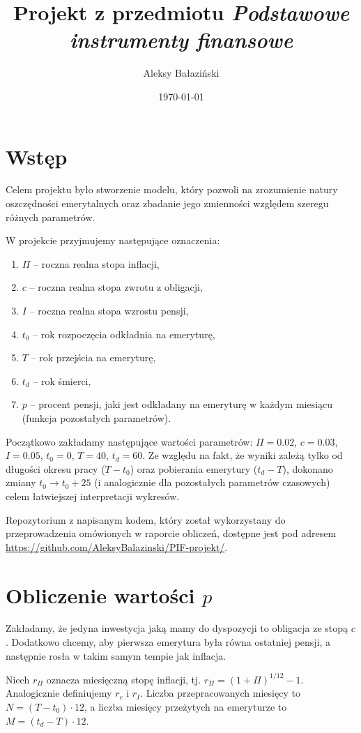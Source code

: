 \documentclass{article}
\title{Projekt z przedmiotu \textit{Podstawowe instrumenty finansowe}}
\author{Aleksy Bałaziński}
\date{\today}
\begin{document}
\maketitle

\section{Wstęp}
Celem projektu było stworzenie modelu, który pozwoli na zrozumienie natury oszczędności emerytalnych oraz zbadanie jego zmienności względem szeregu różnych parametrów.

W projekcie przyjmujemy następujące oznaczenia:
\begin{enumerate}
    \item $\Pi$ -- roczna realna stopa inflacji,
    \item $c$ -- roczna realna stopa zwrotu z obligacji,
    \item $I$ -- roczna realna stopa wzrostu pensji,
    \item $t_0$ -- rok rozpoczęcia odkładnia na emeryturę,
    \item $T$ -- rok przejścia na emeryturę,
    \item $t_d$ -- rok śmierci,
    \item $p$ -- procent pensji, jaki jest odkładany na emeryturę w każdym miesiącu (funkcja pozostałych parametrów).
\end{enumerate}
Początkowo zakładamy następujące wartości parametrów: $\Pi = 0.02$, $c = 0.03$, $I=0.05$, $t_0 = 0$, $T=40$, $t_d = 60$.
Ze względu na fakt, że wyniki zależą tylko od długości okresu pracy ($T - t_0$) oraz pobierania emerytury ($t_d - T$), dokonano zmiany $t_0 \to t_0 + 25$ (i analogicznie dla pozostałych parametrów czasowych) celem łatwiejszej interpretacji wykresów.

Repozytorium z napisanym kodem, który został wykorzystany do przeprowadzenia omówionych w raporcie obliczeń, dostępne jest pod adresem \url{https://github.com/AleksyBalazinski/PIF-projekt/}.

\section{Obliczenie wartości \texorpdfstring{$p$}{p}}
Zakładamy, że jedyna inwestycja jaką mamy do dyspozycji to obligacja ze stopą $c$.
Dodatkowo chcemy, aby pierwsza emerytura była równa ostatniej pensji, a następnie rosła w takim samym tempie jak inflacja.

Niech $r_\Pi$ oznacza miesięczną stopę inflacji, tj. $r_\Pi = (1+\Pi)^{1/12} - 1$.
Analogicznie definiujemy $r_c$ i $r_I$.
Liczba przepracowanych miesięcy to $N = (T-t_0) \cdot 12$, a liczba miesięcy przeżytych na emeryturze to $M=(t_d - T) \cdot 12$.
\end{document}
